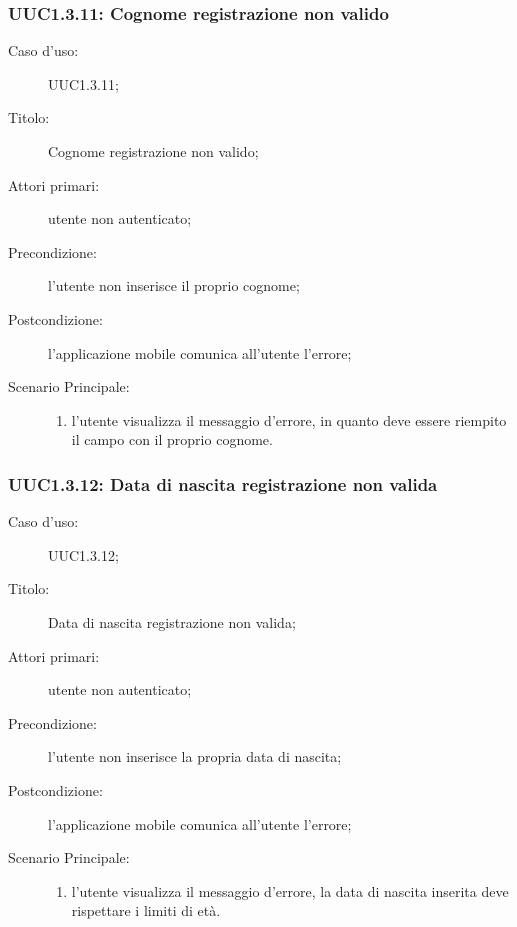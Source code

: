 \documentclass[../../../analisi-dei-requisiti.tex]{subfiles}
\begin{document}
\subsubsection{UUC1.3.11: Cognome registrazione non valido}%
\label{subs:UUC1.3.11}
\begin{description}
  \item[Caso d'uso:] UUC1.3.11;
  \item[Titolo:] Cognome registrazione non valido;
  \item[Attori primari:] utente non autenticato;
  \item[Precondizione:] l'utente non inserisce il proprio cognome;
  \item[Postcondizione:] l'applicazione mobile comunica all'utente l'errore;
  \item[Scenario Principale:]
        \begin{enumerate}
          \item l'utente visualizza il messaggio d'errore, in quanto deve essere riempito il campo con il proprio cognome.
        \end{enumerate}
\end{description}

\subsubsection{UUC1.3.12: Data di nascita registrazione non valida}%
\label{subs:UUC1.3.12}
\begin{description}
  \item[Caso d'uso:] UUC1.3.12;
  \item[Titolo:] Data di nascita registrazione non valida;
  \item[Attori primari:] utente non autenticato;
  \item[Precondizione:] l'utente non inserisce la propria data di nascita;
  \item[Postcondizione:] l'applicazione mobile comunica all'utente l'errore;
  \item[Scenario Principale:]
        \begin{enumerate}
          \item l'utente visualizza il messaggio d'errore, la data di nascita inserita deve rispettare i limiti di età.
        \end{enumerate}
\end{description}
\end{document}
